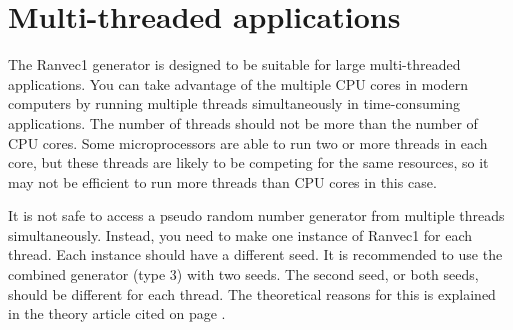 \documentclass[11pt,a4paper,oneside,openright]{report}
\newcommand{\vspacesmall}{\vspace{3mm}}
\begin{document}
\section{Multi-threaded applications}\label{MultiThreadedApplications}
The Ranvec1 generator is designed to be suitable for large multi-threaded applications.
You can take advantage of the multiple CPU cores in modern computers by running multiple threads simultaneously in time-consuming applications. The number of threads should not be more than the number of CPU cores. Some microprocessors are able to run two or more threads in each core, but these threads are likely to be competing for the same resources, so it may not be efficient to run more threads than CPU cores in this case.
\vspacesmall

It is not safe to access a pseudo random number generator from multiple threads simultaneously. Instead, you need to make one instance of Ranvec1 for each thread. Each instance should have a different seed. It is recommended to use the combined generator (type 3) with two seeds. The second seed, or both seeds, should be different for each thread. The theoretical reasons for this is explained in the theory article cited on page \pageref{Fog2015TheoryArticle}.
\end{document}
